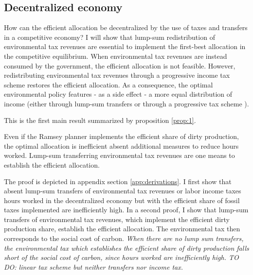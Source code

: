 \subsection{Decentralized economy}

How can the efficient allocation be decentralized by the use of taxes and transfers in a competitive economy? %
I will show that lump-sum redistribution of environmental tax revenues are essential to implement the first-best allocation in the competitive equilibrium. 
When environmental tax revenues are instead consumed by the government, the efficient allocation is not feasible. 
However, redistributing environmental tax revenues through a progressive income tax scheme restores the efficient allocation. 
As a consequence, the optimal environmental policy features - as a side effect - a more equal distribution of income (either through lump-sum transfers or through a progressive tax scheme ).

This is the first main result summarized by proposition \ref{prop:1}. 

\begin{prop}\label{prop:1}
Even if the Ramsey planner implements the efficient share of dirty production, %
the optimal allocation is inefficient absent additional measures to reduce hours worked. Lump-sum transferring environmental tax revenues are one means to establish the efficient allocation. 
\end{prop}


 The proof is depicted in appendix section \ref{app:derivations}. I first show that absent lump-sum transfers of environmental tax revenues or labor income taxes hours worked in the decentralized economy but with the efficient share of fossil taxes implemented are inefficiently high. In a second proof, I show that lump-sum transfers of environmental tax revenues, which implement the efficient dirty production share, establish the efficient allocation.  The environmental tax then corresponds to the social cost of carbon. \textit{When there are no lump sum transfers, the environmental tax which establishes the efficient share of dirty production falls short of the social cost of carbon, since hours worked are inefficiently high. TO DO: linear tax scheme but neither transfers nor income tax. }
 
